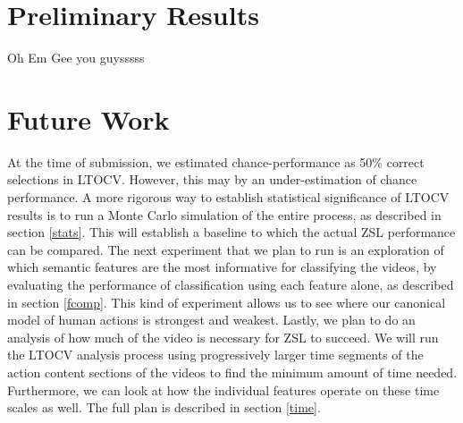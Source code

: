 \documentclass{article}
\begin{document}
\section{Preliminary Results} %
Oh Em Gee you guysssss

\section{Future Work} %
At the time of submission, we estimated chance-performance as 50\% correct selections in LTOCV.  However, this may by an under-estimation of chance performance. A more rigorous way to establish statistical significance of LTOCV results is to run a Monte Carlo simulation of the entire process, as described in section \ref{stats}. This will establish a baseline to which the actual ZSL performance can be compared.
The next experiment that we plan to run is an exploration of which semantic features are the most informative for classifying the videos, by evaluating the performance of classification using each feature alone, as described in section \ref{fcomp}. This kind of experiment allows us to see where our canonical model of human actions is strongest and weakest.
Lastly, we plan to do an analysis of how much of the video is necessary for ZSL to succeed. We will run the LTOCV analysis process using progressively larger time segments of the action content sections of the videos to find the minimum amount of time needed. Furthermore, we can look at how the individual features operate on these time scales as well. The full plan is described in section \ref{time}.


\end{document}
